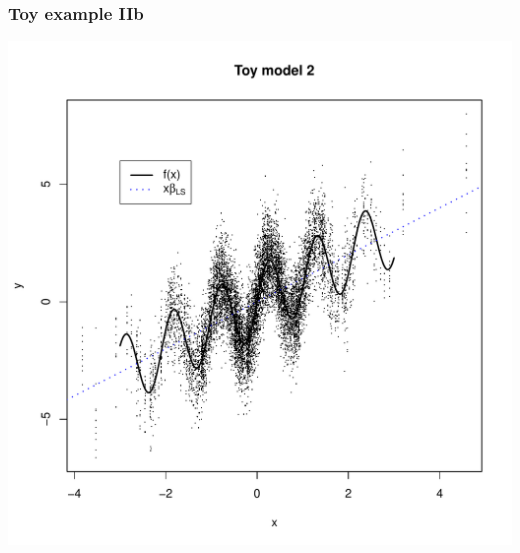 \documentclass{beamer}
\begin{document}
\begin{frame}
\frametitle{Toy example IIb}
\begin{center}
\includegraphics[scale = 0.4]{toy2_plot.pdf}
\end{center}
\end{frame}
\end{document}

